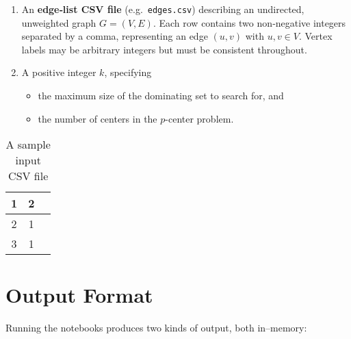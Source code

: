 \documentclass[conference]{IEEEtran}
\begin{document}
\begin{enumerate}
  \item An {\bf edge‐list CSV file} (e.g.\ \texttt{edges.csv}) describing an undirected, unweighted graph $G=(V,E)$.  Each row contains two non‐negative integers separated by a comma, representing an edge $(u,v)$ with $u,v\in V$.  Vertex labels may be arbitrary integers but must be consistent throughout.  
  \item A positive integer $k$, specifying
    \begin{itemize}
      \item the maximum size of the dominating set to search for, and
      \item the number of centers in the $p$-center problem.
    \end{itemize}
\end{enumerate}


\begin{table}[htbp]
    \centering
    \caption{A sample input CSV file}
    \label{tab:input}
    \begin{tabular}{|c|c|c|}
        \hline
        1 & 2 \\
        \hline
        2 & 1 \\
        \hline
        3 & 1   \\
        \hline
    \end{tabular}
\end{table}

\section{Output Format}

Running the notebooks produces two kinds of output, both in–memory:
\end{document}
